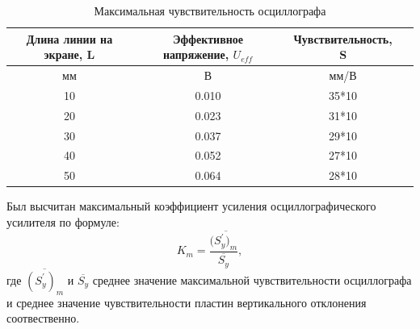 \begin{center}
\begin{table}[h!]
\centering
\caption{Максимальная чувствительность осциллографа}
\label{tabl:1}
\begin{tabular}{|c|c|c|c|}
\hline
\begin{minipage}{5cm}
    Длина линии на экране, L
\end{minipage} &
\begin{minipage}{5cm}
    Эффективное напряжение, $U_{eff}$
\end{minipage} &
\begin{minipage}{5cm}
    Чувствительность, S
\end{minipage}\\
\hline
мм&В&мм/В\\
\hline
10  &  0.010 &  35*10 \\
20  &  0.023  &  31*10\\
30  &  0.037  &  29*10 \\
40  &  0.052  &  27*10 \\
50  &  0.064  &  28*10 \\
\hline
\end{tabular}
\end{table}
\end{center}
Был высчитан максимальный коэффициент усиления осциллографического усилителя по формуле:
\begin{equation}
   K_m=\frac{(\overline{S^{'}_y)_m}}{\overline{S^{}_y}},
\end{equation}
где $\overline{(S^{'}_y)_m}$ и $\overline{S^{}_y}$ среднее значение максимальной чувствительности осциллографа и среднее значение чувствительности пластин вертикального отклонения соотвественно. 


